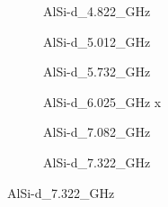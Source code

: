 \documentclass[../../main.tex]{subfiles}
\begin{document}
\begin{figure}[H]
    \begin{subfigure}{0.33\textwidth}
        \centering
        \setlength{}
        \setlength\figureheight{10em}
        
        \caption{AlSi-d\_4.822\_GHz}
    \end{subfigure}
    \begin{subfigure}{0.33\textwidth}
        \centering
        \setlength{}
        \setlength\figureheight{10em}
        
        \caption{AlSi-d\_5.012\_GHz}
    \end{subfigure}
    \begin{subfigure}{0.33\textwidth}
        \centering
        \setlength{}
        \setlength\figureheight{10em}
        
        \caption{AlSi-d\_5.732\_GHz}
    \end{subfigure}

    \begin{subfigure}{0.33\textwidth}
        \centering
        \setlength{}
        \setlength\figureheight{10em}
        
        \caption{AlSi-d\_6.025\_GHz x}
    \end{subfigure}
        \begin{subfigure}{0.33\textwidth}
        \centering
        \setlength{}
        \setlength\figureheight{10em}
        
        \caption{AlSi-d\_7.082\_GHz}
    \end{subfigure}
    \begin{subfigure}{0.33\textwidth}
        \centering
        \setlength{}
        \setlength\figureheight{10em}
        
        \caption{AlSi-d\_7.322\_GHz}
    \end{subfigure}
\end{figure}


 
 
 
\end{document}
